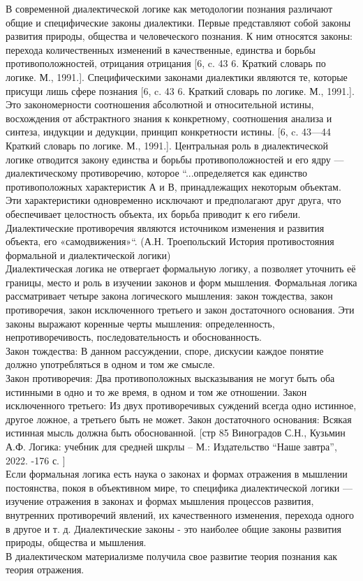 \documentclass[a4paper,12pt]{report}
\begin{document}
	В современной диалектической логике как методологии познания различают общие и специфические законы диалектики. Первые представляют собой законы развития природы, общества и человеческого познания. К ним относятся законы: перехода количественных изменений в качественные, единства и борьбы противоположностей, отрицания отрицания [6, c. 43 6. Краткий словарь по логике. М., 1991.]. Специфическими законами диалектики являются те, которые присущи лишь сфере познания [6, c. 43 6. Краткий словарь по логике. М., 1991.]. Это закономерности соотношения абсолютной и относительной истины, восхождения от абстрактного знания к конкретному, соотношения анализа и синтеза, индукции и дедукции, принцип конкретности истины. [6, c. 43—44  Краткий словарь по логике. М., 1991.]. Центральная роль  в диалектической логике отводится закону единства и борьбы противоположностей и его ядру — диалектическому противоречию, которое   “...определяется как единство противоположных характеристик А и В, принадлежащих некоторым объектам. Эти характеристики одновременно исключают и предполагают друг друга, что обеспечивает целостность объекта, их борьба приводит к его гибели. Диалектические противоречия являются источником изменения и развития объекта, его «самодвижения»“. (А.Н. Троепольский История противостояния формальной и диалектической логики) \\

Диалектическая логика не отвергает формальную логику, а позволяет уточнить её границы, место и роль в изучении законов и форм мышления. Формальная логика рассматривает четыре закона логического мышления: закон тождества, закон противоречия, закон исключенного третьего и закон достаточного основания. Эти законы выражают коренные черты мышления: определенность, непротиворечивость, последовательность и обоснованность.\\
Закон тождества: В данном рассуждении, споре, дискусии каждое понятие должно употребляться в одном и том же смысле.\\
Закон противоречия: Два противоположных высказывания не могут быть оба истинными в одно и то же время, в одном и том же отношении.
Закон исключенного третьего: Из двух противоречивых суждений всегда одно истинное, другое ложное, а третьего быть не может.
Закон достаточного основания: Всякая истинная мысль должна быть обоснованной. [стр 85 Виноградов С.Н., Кузьмин А.Ф. Логика: учебник для средней шкрлы – М.: Издательство “Наше завтра”, 2022. -176 с. ]\\
	Если формальная логика есть наука о законах и формах отражения в мышлении постоянства, покоя в объективном мире, то специфика диалектической логики — изучение отражения в законах и формах мышления процессов развития, внутренних противоречий явлений, их качественного изменения, перехода одного в другое и т. д.  Диалектические законы - это наиболее общие законы развития природы, общества и мышления.\\
В диалектическом материализме получила свое развитие теория познания как теория отражения.\\
\end{document}
